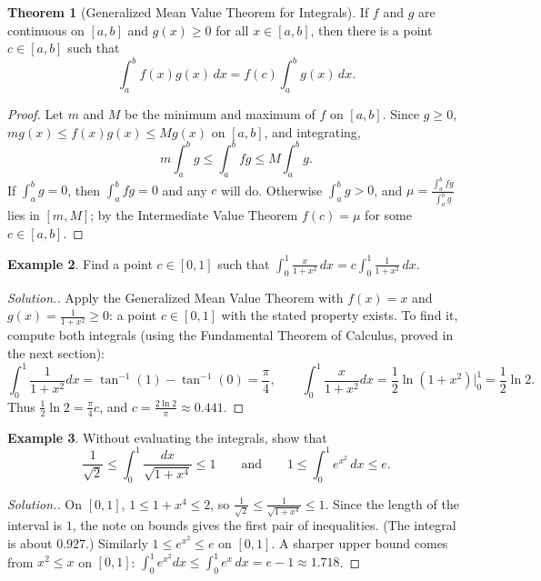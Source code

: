 \documentclass[11pt,a4paper]{article}
\numberwithin{equation}{section}
\theoremstyle{definition}
\newtheorem{thm}{Theorem}[subsection]
\newtheorem{exa}[thm]{Example}
\newenvironment{solution}
  {\renewcommand{\qedsymbol}{}\begin{proof}[\textit{Solution}.]}
  {\end{proof}}
\begin{document}
\begin{thm}[Generalized Mean Value Theorem for Integrals]
If $f$ and $g$ are continuous on $[a,b]$ and $g(x)\geq 0$ for all $x\in [a,b]$, then there is a point $c\in [a,b]$ such that
$$\int^b_af(x) g(x) \, dx = f(c) \int^b_ag(x)\, dx .$$
\end{thm}

\begin{proof}
Let $m$ and $M$ be the minimum and maximum of $f$ on $[a,b]$. Since $g\geq 0$, $m g(x) \leq f(x) g(x) \leq M g(x)$ on $[a,b]$, and integrating,
$$m \int^b_ag \leq \int^b_afg \leq M \int^b_ag .$$
If $\int_a^bg = 0$, then $\int_a^bfg = 0$ and any $c$ will do. Otherwise $\int_a^bg>0$, and $\mu = \frac{\int_a^bfg}{\int_a^bg}$ lies in $[m,M]$; by the Intermediate Value Theorem $f(c) = \mu$ for some $c\in [a,b]$.
\end{proof}


\begin{exa}
Find a point $c\in[0,1]$ such that $\displaystyle\int^1_0 \frac{x}{1 + x^2}\,dx = c\int_0^1\frac{1}{1+x^2}\,dx$.
\end{exa}

\begin{solution}
Apply the Generalized Mean Value Theorem with $f(x) = x$ and $g(x) = \frac{1}{1 + x^2}\geq0$: a point $c\in[0,1]$ with the stated property exists. To find it, compute both integrals (using the Fundamental Theorem of Calculus, proved in the next section):
$$\int^1_0\frac{1}{1 + x^2} dx = \tan^{-1}(1) - \tan^{-1}(0) = \frac{\pi}{4},\qquad \int^1_0\frac{x}{1 + x^2} dx = \frac{1}{2}\ln (1 + x^2)\Big|^1_0 = \frac{1}{2}\ln 2 .$$
Thus $\frac{1}{2}\ln 2 = \frac{\pi}{4} c$, and $c = \frac{2\ln 2}{\pi}\approx 0.441$.
\end{solution}

\begin{exa}
Without evaluating the integrals, show that
$$\frac{1}{\sqrt{2}}\leq\int_0^1\frac{dx}{\sqrt{1+x^4}}\leq 1 \qquad\text{and}\qquad 1\leq\int_0^1e^{x^2}\,dx\leq e .$$
\end{exa}

\begin{solution}
On $[0,1]$, $1\leq 1+x^4\leq 2$, so $\frac{1}{\sqrt{2}}\leq\frac{1}{\sqrt{1+x^4}}\leq 1$. Since the length of the interval is $1$, the note on bounds gives the first pair of inequalities. (The integral is about $0.927$.) Similarly $1\leq e^{x^2}\leq e$ on $[0,1]$. A sharper upper bound comes from $x^2\leq x$ on $[0,1]$: $\int_0^1e^{x^2}dx\leq\int_0^1e^x\,dx = e - 1\approx 1.718$.
\end{solution}
\end{document}
